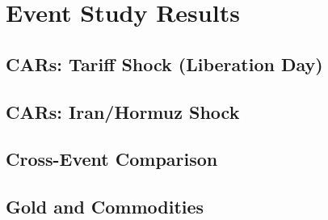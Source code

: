 
\chapter{Event Study Results}
\label{ch:event_study}



\section{CARs: Tariff Shock (Liberation Day)}
\label{sec:es_tariff}



\section{CARs: Iran/Hormuz Shock}
\label{sec:es_iran}



\section{Cross-Event Comparison}
\label{sec:es_comparison}



\section{Gold and Commodities}
\label{sec:es_gold}

